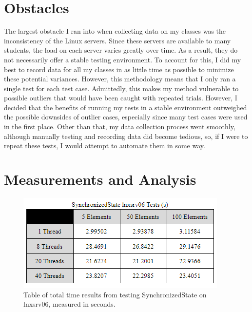 \section{Obstacles}

The largest obstacle I ran into when collecting data on my classes was the
inconsistency of the Linux servers. Since these servers are available to many
students, the load on each server varies greatly over time. As a result, they do
not necessarily offer a stable testing environment. To account for this, I did
my best to record data for all my classes in as little time as possible to
minimize these potential variances. However, this methodology means that I only
ran a single test for each test case. Admittedly, this makes my method vulnerable
to possible outliers that would have been caught with repeated trials. However,
I decided that the benefits of running my tests in a stable environment 
outweighed the possible downsides of outlier cases, especially since many test cases
were used in the first place. Other than that, my data collection process went 
smoothly, although manually testing and recording data did become tedious, so, if I
were to repeat these tests, I would attempt to automate them in some way.

\section{Measurements and Analysis}

\begin{figure}
  \includegraphics[scale=0.8]{synchronized-06.png}
  \caption{\label{fig:vectors} Table of total time results from testing SynchronizedState on lnxsrv06, measured in seconds. }
\end{figure}

